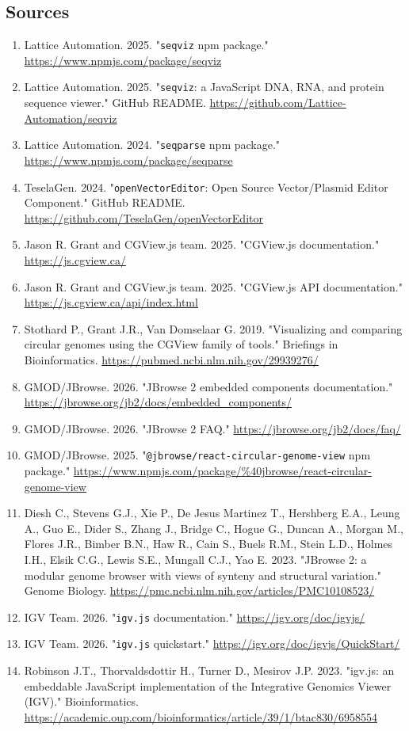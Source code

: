 \documentclass[11pt]{report}
\begin{document}
\subsection{Sources}
\begin{enumerate}
\item Lattice Automation. 2025. "\texttt{seqviz} npm package." \url{https://www.npmjs.com/package/seqviz}
\item Lattice Automation. 2025. "\texttt{seqviz}: a JavaScript DNA, RNA, and protein sequence viewer." GitHub README. \url{https://github.com/Lattice-Automation/seqviz}
\item Lattice Automation. 2024. "\texttt{seqparse} npm package." \url{https://www.npmjs.com/package/seqparse}
\item TeselaGen. 2024. "\texttt{openVectorEditor}: Open Source Vector/Plasmid Editor Component." GitHub README. \url{https://github.com/TeselaGen/openVectorEditor}
\item Jason R. Grant and CGView.js team. 2025. "CGView.js documentation." \url{https://js.cgview.ca/}
\item Jason R. Grant and CGView.js team. 2025. "CGView.js API documentation." \url{https://js.cgview.ca/api/index.html}
\item Stothard P., Grant J.R., Van Domselaar G. 2019. "Visualizing and comparing circular genomes using the CGView family of tools." Briefings in Bioinformatics. \url{https://pubmed.ncbi.nlm.nih.gov/29939276/}
\item GMOD/JBrowse. 2026. "JBrowse 2 embedded components documentation." \url{https://jbrowse.org/jb2/docs/embedded_components/}
\item GMOD/JBrowse. 2026. "JBrowse 2 FAQ." \url{https://jbrowse.org/jb2/docs/faq/}
\item GMOD/JBrowse. 2025. "\texttt{@jbrowse/react-circular-genome-view} npm package." \url{https://www.npmjs.com/package/\%40jbrowse/react-circular-genome-view}
\item Diesh C., Stevens G.J., Xie P., De Jesus Martinez T., Hershberg E.A., Leung A., Guo E., Dider S., Zhang J., Bridge C., Hogue G., Duncan A., Morgan M., Flores J.R., Bimber B.N., Haw R., Cain S., Buels R.M., Stein L.D., Holmes I.H., Elsik C.G., Lewis S.E., Mungall C.J., Yao E. 2023. "JBrowse 2: a modular genome browser with views of synteny and structural variation." Genome Biology. \url{https://pmc.ncbi.nlm.nih.gov/articles/PMC10108523/}
\item IGV Team. 2026. "\texttt{igv.js} documentation." \url{https://igv.org/doc/igvjs/}
\item IGV Team. 2026. "\texttt{igv.js} quickstart." \url{https://igv.org/doc/igvjs/QuickStart/}
\item Robinson J.T., Thorvaldsdottir H., Turner D., Mesirov J.P. 2023. "igv.js: an embeddable JavaScript implementation of the Integrative Genomics Viewer (IGV)." Bioinformatics. \url{https://academic.oup.com/bioinformatics/article/39/1/btac830/6958554}
\end{enumerate}
\end{document}
